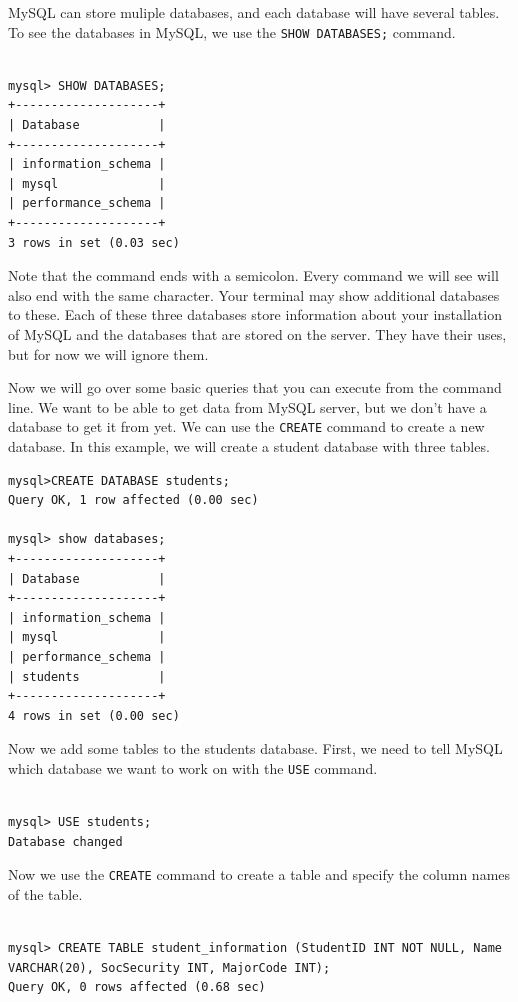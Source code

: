 MySQL can store muliple databases, and each database will have several tables.  To see the databases in MySQL, we use the {\tt SHOW DATABASES;} command.

\begin{lstlisting}

mysql> SHOW DATABASES;
+--------------------+
| Database           |
+--------------------+
| information_schema |
| mysql              |
| performance_schema |
+--------------------+
3 rows in set (0.03 sec)

\end{lstlisting}

Note that the command ends with a semicolon. Every command we will see will also end with the same character.  Your terminal may show additional databases to these.  Each of these three databases store information about your installation of MySQL and the databases that are stored on the server.  They have their uses, but for now we will ignore them.

Now we will go over some basic queries that you can execute from the command line.  We want to be able to get data from MySQL server, but we don't have a database to get it from yet.  We can use the {\tt CREATE} command to create a new database.  In this example, we will create a student database with three tables.

\begin{lstlisting}
mysql>CREATE DATABASE students;
Query OK, 1 row affected (0.00 sec)

mysql> show databases;
+--------------------+
| Database           |
+--------------------+
| information_schema |
| mysql              |
| performance_schema |
| students           |
+--------------------+
4 rows in set (0.00 sec)

\end{lstlisting}

Now we add some tables to the students database.  First, we need to tell MySQL which database we want to work on with the {\tt USE} command.

\begin{lstlisting}

mysql> USE students;
Database changed

\end{lstlisting}

Now we use the {\tt CREATE} command to create a table and specify the column names of the table.

\begin{lstlisting}

mysql> CREATE TABLE student_information (StudentID INT NOT NULL, Name VARCHAR(20), SocSecurity INT, MajorCode INT);
Query OK, 0 rows affected (0.68 sec)

\end{lstlisting}

